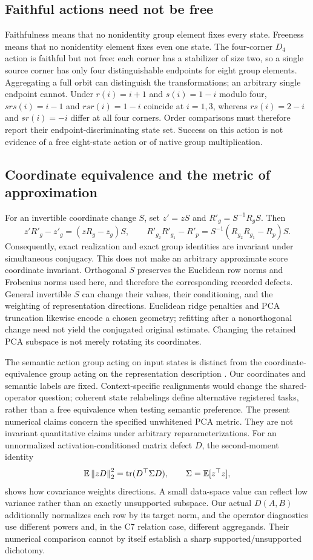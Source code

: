 \subsection{Faithful actions need not be free}
\label{app:faithful-not-free}
Faithfulness means that no nonidentity group element fixes every state. Freeness means that no nonidentity element fixes even one state. The four-corner $D_4$ action is faithful but not free: each corner has a stabilizer of size two, so a single source corner has only four distinguishable endpoints for eight group elements. Aggregating a full orbit can distinguish the transformations; an arbitrary single endpoint cannot. Under $r(i)=i+1$ and $s(i)=1-i$ modulo four, $srs(i)=i-1$ and $rsr(i)=1-i$ coincide at $i=1,3$, whereas $rs(i)=2-i$ and $sr(i)=-i$ differ at all four corners. Order comparisons must therefore report their endpoint-discriminating state set. Success on this action is not evidence of a free eight-state action or of native group multiplication.

\subsection{Coordinate equivalence and the metric of approximation}
\label{app:coordinates}
For an invertible coordinate change $S$, set $z'=zS$ and $R'_g=S^{-1}R_gS$. Then
\[
 z'R'_g-z'_{g}= (zR_g-z_g)S,\qquad
 R'_{g_2}R'_{g_1}-R'_{p}
 =S^{-1}(R_{g_2}R_{g_1}-R_p)S.
\]
Consequently, exact realization and exact group identities are invariant under simultaneous conjugacy. This does not make an arbitrary approximate score coordinate invariant. Orthogonal $S$ preserves the Euclidean row norms and Frobenius norms used here, and therefore the corresponding recorded defects. General invertible $S$ can change their values, their conditioning, and the weighting of representation directions. Euclidean ridge penalties and PCA truncation likewise encode a chosen geometry; refitting after a nonorthogonal change need not yield the conjugated original estimate. Changing the retained PCA subspace is not merely rotating its coordinates.

The semantic action group acting on input states is distinct from the coordinate-equivalence group acting on the representation description \citep{yao2026groupaction}. Our coordinates and semantic labels are fixed. Context-specific realignments would change the shared-operator question; coherent state relabelings define alternative registered tasks, rather than a free equivalence when testing semantic preference. The present numerical claims concern the specified unwhitened PCA metric. They are not invariant quantitative claims under arbitrary reparameterizations. For an unnormalized activation-conditioned matrix defect $D$, the second-moment identity
\[
 \mathbb{E}\left\lVert zD\right\rVert_2^2=\operatorname{tr}(D^\top\Sigma D),\qquad
 \Sigma=\mathbb{E}[z^\top z],
\]
shows how covariance weights directions. A small data-space value can reflect low variance rather than an exactly unsupported subspace. Our actual $D(A,B)$ additionally normalizes each row by its target norm, and the operator diagnostics use different powers and, in the C7 relation case, different aggregands. Their numerical comparison cannot by itself establish a sharp supported/unsupported dichotomy.


